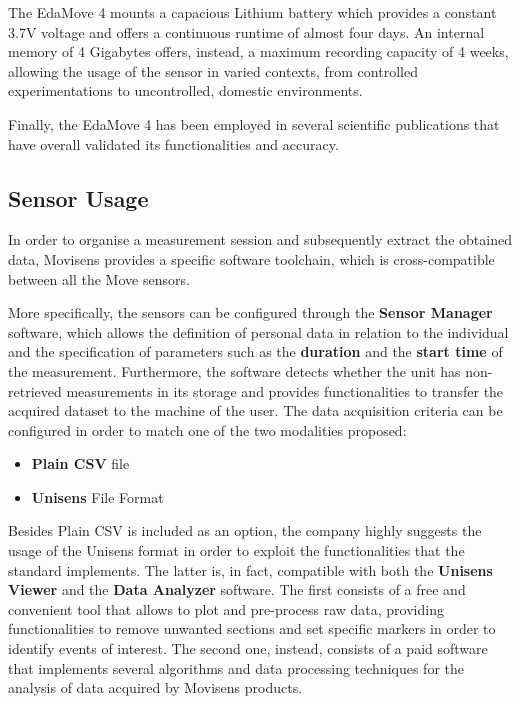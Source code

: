The EdaMove 4 mounts a capacious Lithium battery which provides a constant 3.7V voltage and offers a continuous runtime of almost four days. An internal memory of 4 Gigabytes offers, instead, a maximum recording capacity of 4 weeks, allowing the usage of the sensor in varied contexts, from controlled experimentations to uncontrolled, domestic environments. 

Finally, the EdaMove 4 has been employed in several scientific publications that have overall validated its functionalities and accuracy.

\subsection{Sensor Usage}\label{subsec:edamove4-usage}

In order to organise a measurement session and subsequently extract the obtained data, Movisens provides a specific software toolchain, which is cross-compatible between all the Move sensors. 

More specifically, the sensors can be configured through the \textbf{Sensor Manager} software, which allows the definition of personal data in relation to the individual and the specification of parameters such as the \textbf{duration} and the \textbf{start time} of the measurement. Furthermore, the software detects whether the unit has non-retrieved measurements in its storage and provides functionalities to transfer the acquired dataset to the machine of the user. The data acquisition criteria can be configured in order to match one of the two modalities proposed:

\begin{itemize}
    \item \textbf{Plain CSV} file
    \item \textbf{Unisens} File Format 
\end{itemize}

Besides Plain CSV is included as an option, the company highly suggests the usage of the Unisens format in order to exploit the functionalities that the standard implements. The latter is, in fact, compatible with both the \textbf{Unisens Viewer} and the \textbf{Data Analyzer} software. The first consists of a free and convenient tool that allows to plot and pre-process raw data, providing functionalities to remove unwanted sections and set specific markers in order to identify events of interest. The second one, instead, consists of a paid software that implements several algorithms and data processing techniques for the analysis of data acquired by Movisens products.

